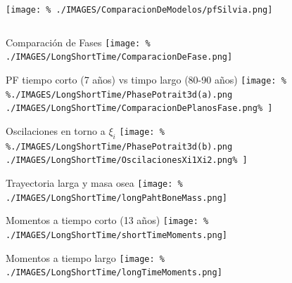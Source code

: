 \begin{frame}[plain]	
	\begin{columns}
		\column[t]{60mm}
		\column[t]{50 mm}
				\texttt{[image: \%
					./IMAGES/ComparacionDeModelos/pfSilvia.png]}
	\end{columns}	
\end{frame}
\begin{frame}[plain]{Comparación de Fases}
	\texttt{[image: \%
		./IMAGES/LongShortTime/ComparacionDeFase.png]}
\end{frame}
\begin{frame}[plain]{PF tiempo corto (7 años) vs timpo largo (80-90 años)} 
	\texttt{[image: \%
		\%./IMAGES/LongShortTime/PhasePotrait3d(a).png
		./IMAGES/LongShortTime/ComparacionDePlanosFase.png\%
		]}
\end{frame}
\begin{frame}[plain]{Oscilaciones en torno a $\xi_i$}
	\texttt{[image: \%
		\%./IMAGES/LongShortTime/PhasePotrait3d(b).png
		./IMAGES/LongShortTime/OscilacionesXi1Xi2.png\%
		]}
\end{frame}
\begin{frame}[plain]{Trayectoria larga y  masa osea}
	\texttt{[image: \%
		./IMAGES/LongShortTime/longPahtBoneMass.png]}
\end{frame}
\begin{frame}[plain]{Momentos a tiempo corto (13 años)}
	\texttt{[image: \%
		./IMAGES/LongShortTime/shortTimeMoments.png]}
\end{frame}
\begin{frame}[plain]{Momentos a tiempo largo}
	\texttt{[image: \%
		./IMAGES/LongShortTime/longTimeMoments.png]}
\end{frame}
